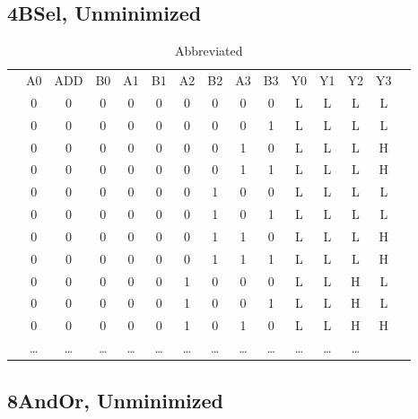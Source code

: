 \documentclass[letterpaper,titlepage,oneside]{article}
\begin{document}
\subsection*{4BSel, Unminimized}

\begin{center}
\begin{table}['h']
\begin{tabular}{c|c|c|c|c|c|c|c|c|c|c|c|c|c|c}
\cline{2-14}
 & A0 & ADD & B0 & A1 & B1 & A2 & B2 & A3 & B3 & Y0 & Y1 & Y2 & Y3 &  \\ \cline{2-14}

 & 0 & 0 & 0 & 0 & 0 & 0 & 0 & 0 & 0 & L & L & L & L\\
 & 0 & 0 & 0 & 0 & 0 & 0 & 0 & 0 & 1 & L & L & L & L\\
 & 0 & 0 & 0 & 0 & 0 & 0 & 0 & 1 & 0 & L & L & L & H\\
 & 0 & 0 & 0 & 0 & 0 & 0 & 0 & 1 & 1 & L & L & L & H\\
 & 0 & 0 & 0 & 0 & 0 & 0 & 1 & 0 & 0 & L & L & L & L\\
 & 0 & 0 & 0 & 0 & 0 & 0 & 1 & 0 & 1 & L & L & L & L\\
 & 0 & 0 & 0 & 0 & 0 & 0 & 1 & 1 & 0 & L & L & L & H\\
 & 0 & 0 & 0 & 0 & 0 & 0 & 1 & 1 & 1 & L & L & L & H\\
 & 0 & 0 & 0 & 0 & 0 & 1 & 0 & 0 & 0 & L & L & H & L\\
 & 0 & 0 & 0 & 0 & 0 & 1 & 0 & 0 & 1 & L & L & H & L\\
 & 0 & 0 & 0 & 0 & 0 & 1 & 0 & 1 & 0 & L & L & H & H\\
 & \ldots{} & \ldots{} & \ldots{} & \ldots{} & \ldots{} & \ldots{} & %
\ldots{} & \ldots{} & \ldots{} & \ldots{} & \ldots{} & \ldots{} & \\
\cline{2-14}
\end{tabular}
\caption{Abbreviated}\label{table:4BSel_Unminimized}
\end{table}
\end{center}

\subsection*{8AndOr, Unminimized}
\end{document}
